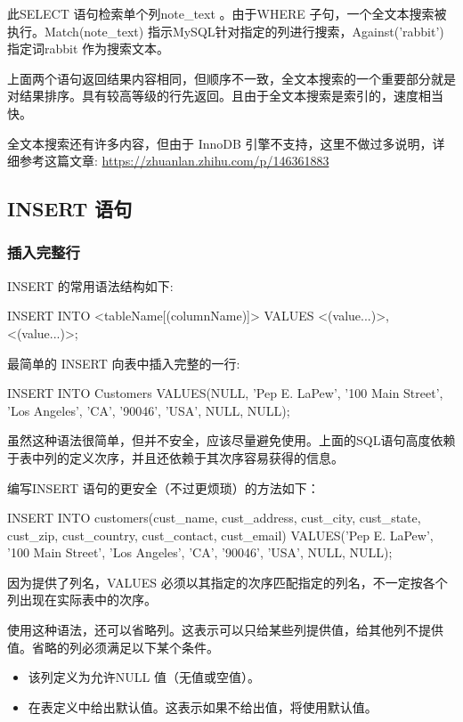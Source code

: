 此SELECT 语句检索单个列note\_text 。由于WHERE 子句，一个全文本搜索被执行。Match(note\_text) 指示MySQL针对指定的列进行搜索，Against('rabbit') 指定词rabbit 作为搜索文本。

上面两个语句返回结果内容相同，但顺序不一致，全文本搜索的一个重要部分就是对结果排序。具有较高等级的行先返回。且由于全文本搜索是索引的，速度相当快。

全文本搜索还有许多内容，但由于 InnoDB 引擎不支持，这里不做过多说明，详细参考这篇文章: \url{https://zhuanlan.zhihu.com/p/146361883}

\subsection{INSERT 语句}

\subsubsection{插入完整行}

INSERT 的常用语法结构如下:
\begin{sql}
INSERT INTO <tableName[(columnName)]>
VALUES <(value...)>, <(value...)>;
\end{sql}

最简单的 INSERT 向表中插入完整的一行:

\begin{sql}
INSERT INTO Customers
    VALUES(NULL, 'Pep E. LaPew', '100 Main Street', 'Los Angeles', 'CA', '90046', 'USA', NULL, NULL);
\end{sql}

虽然这种语法很简单，但并不安全，应该尽量避免使用。上面的SQL语句高度依赖于表中列的定义次序，并且还依赖于其次序容易获得的信息。

编写INSERT 语句的更安全（不过更烦琐）的方法如下：

\begin{sql}
INSERT INTO customers(cust_name, cust_address, cust_city, cust_state, cust_zip, cust_country, cust_contact, cust_email)
VALUES('Pep E. LaPew', '100 Main Street', 'Los Angeles', 'CA', '90046', 'USA', NULL, NULL);
\end{sql}

因为提供了列名，VALUES 必须以其指定的次序匹配指定的列名，不一定按各个列出现在实际表中的次序。

使用这种语法，还可以省略列。这表示可以只给某些列提供值，给其他列不提供值。省略的列必须满足以下某个条件。

\begin{itemize}
    \item 该列定义为允许NULL 值（无值或空值）。
    \item 在表定义中给出默认值。这表示如果不给出值，将使用默认值。
\end{itemize}

